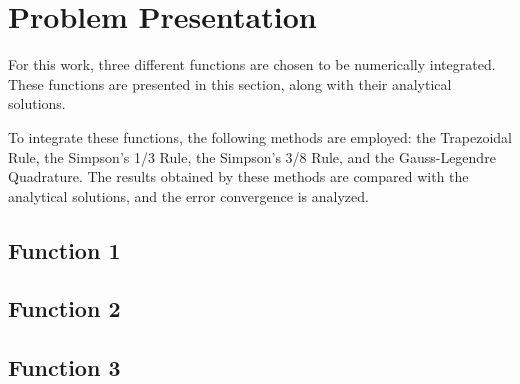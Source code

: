 \section{Problem Presentation}\label{sec:problem-presentation}
For this work, three different functions are chosen to be numerically integrated. These functions are presented in this section, along with their analytical solutions. 

To integrate these functions, the following methods are employed: the Trapezoidal Rule, the Simpson's 1/3 Rule, the Simpson's 3/8 Rule, and the Gauss-Legendre Quadrature. The results obtained by these methods are compared with the analytical solutions, and the error convergence is analyzed.

\subsection{Function 1}

\subsection{Function 2}

\subsection{Function 3}